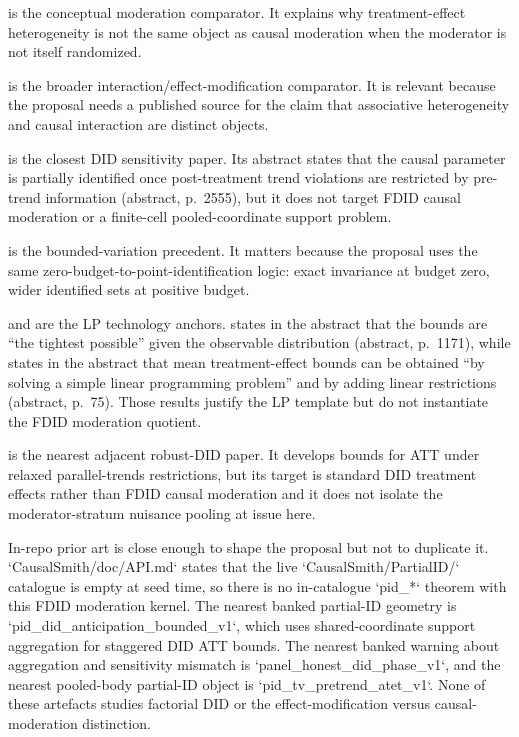 \documentclass[11pt]{article}
\theoremstyle{definition}
\theoremstyle{plain}
\theoremstyle{remark}
\begin{document}
\citet{Bansak2021CausalModeration} is the conceptual moderation comparator. It explains why treatment-effect heterogeneity is not the same object as causal moderation when the moderator is not itself randomized.

\citet{VanderWeele2009InteractionEffectModification} is the broader interaction/effect-modification comparator. It is relevant because the proposal needs a published source for the claim that associative heterogeneity and causal interaction are distinct objects.

\citet{RambachanRoth2023ParallelTrends} is the closest DID sensitivity paper. Its abstract states that the causal parameter is partially identified once post-treatment trend violations are restricted by pre-trend information (abstract, p.~2555), but it does not target FDID causal moderation or a finite-cell pooled-coordinate support problem.

\citet{ManskiPepper2018BoundedVariation} is the bounded-variation precedent. It matters because the proposal uses the same zero-budget-to-point-identification logic: exact invariance at budget zero, wider identified sets at positive budget.

\citet{BalkePearl1997Bounds} and \citet{Demuynck2015LPBounds} are the LP technology anchors. \citet{BalkePearl1997Bounds} states in the abstract that the bounds are ``the tightest possible'' given the observable distribution (abstract, p.~1171), while \citet{Demuynck2015LPBounds} states in the abstract that mean treatment-effect bounds can be obtained ``by solving a simple linear programming problem'' and by adding linear restrictions (abstract, p.~75). Those results justify the LP template but do not instantiate the FDID moderation quotient.

\citet{BanKedagni2023RobustDID} is the nearest adjacent robust-DID paper. It develops bounds for ATT under relaxed parallel-trends restrictions, but its target is standard DID treatment effects rather than FDID causal moderation and it does not isolate the moderator-stratum nuisance pooling at issue here.

In-repo prior art is close enough to shape the proposal but not to duplicate it. `CausalSmith/doc/API.md` states that the live `CausalSmith/PartialID/` catalogue is empty at seed time, so there is no in-catalogue `pid_*` theorem with this FDID moderation kernel. The nearest banked partial-ID geometry is `pid_did_anticipation_bounded_v1`, which uses shared-coordinate support aggregation for staggered DID ATT bounds. The nearest banked warning about aggregation and sensitivity mismatch is `panel_honest_did_phase_v1`, and the nearest pooled-body partial-ID object is `pid_tv_pretrend_atet_v1`. None of these artefacts studies factorial DID or the effect-modification versus causal-moderation distinction.
\end{document}
